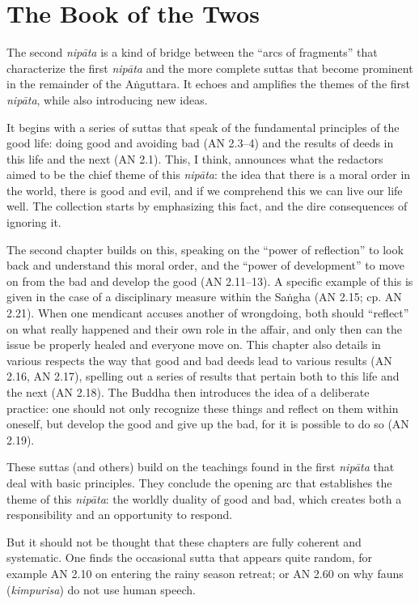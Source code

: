 \documentclass[12pt,openany]{book}%
\begin{document}
\section*{The Book of the Twos}

The second \textit{\textsanskrit{nipāta}} is a kind of bridge between the “arcs of fragments” that characterize the first \textit{\textsanskrit{nipāta}} and the more complete suttas that become prominent in the remainder of the \textsanskrit{Aṅguttara}. It echoes and amplifies the themes of the first \textit{\textsanskrit{nipāta}}, while also introducing new ideas.

It begins with a series of suttas that speak of the fundamental principles of the good life: doing good and avoiding bad (AN 2.3–4) and the results of deeds in this life and the next (AN 2.1). This, I think, announces what the redactors aimed to be the chief theme of this \textit{\textsanskrit{nipāta}}: the idea that there is a moral order in the world, there is good and evil, and if we comprehend this we can live our life well. The collection starts by emphasizing this fact, and the dire consequences of ignoring it.

The second chapter builds on this, speaking on the “power of reflection” to look back and understand this moral order, and the “power of development” to move on from the bad and develop the good (AN 2.11–13). A specific example of this is given in the case of a disciplinary measure within the \textsanskrit{Saṅgha} (AN 2.15; cp. AN 2.21). When one mendicant accuses another of wrongdoing, both should “reflect” on what really happened and their own role in the affair, and only then can the issue be properly healed and everyone move on. This chapter also details in various respects the way that good and bad deeds lead to various results (AN 2.16, AN 2.17), spelling out a series of results that pertain both to this life and the next (AN 2.18). The Buddha then introduces the idea of a deliberate practice: one should not only recognize these things and reflect on them within oneself, but develop the good and give up the bad, for it is possible to do so (AN 2.19).

These suttas (and others) build on the teachings found in the first \textit{\textsanskrit{nipāta}} that deal with basic principles. They conclude the opening arc that establishes the theme of this \textit{\textsanskrit{nipāta}}: the worldly duality of good and bad, which creates both a responsibility and an opportunity to respond.

But it should not be thought that these chapters are fully coherent and systematic. One finds the occasional sutta that appears quite random, for example AN 2.10 on entering the rainy season retreat; or AN 2.60 on why fauns (\textit{kimpurisa}) do not use human speech.
\end{document}
